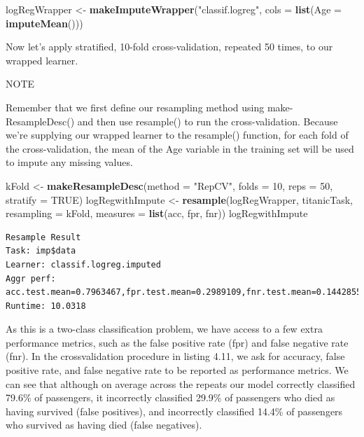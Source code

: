 \documentclass[
]{article}
\newenvironment{Shaded}{\begin{snugshade}}{\end{snugshade}}
\newcommand{\AttributeTok}[1]{\textcolor[rgb]{0.13,0.29,0.53}{#1}}
\newcommand{\ConstantTok}[1]{\textcolor[rgb]{0.56,0.35,0.01}{#1}}
\newcommand{\DecValTok}[1]{\textcolor[rgb]{0.00,0.00,0.81}{#1}}
\newcommand{\FunctionTok}[1]{\textcolor[rgb]{0.13,0.29,0.53}{\textbf{#1}}}
\newcommand{\NormalTok}[1]{#1}
\newcommand{\OtherTok}[1]{\textcolor[rgb]{0.56,0.35,0.01}{#1}}
\newcommand{\StringTok}[1]{\textcolor[rgb]{0.31,0.60,0.02}{#1}}
\begin{document}
\begin{Shaded}
\begin{Highlighting}[]
\NormalTok{logRegWrapper }\OtherTok{\textless{}{-}} \FunctionTok{makeImputeWrapper}\NormalTok{(}\StringTok{"classif.logreg"}\NormalTok{,}
                                   \AttributeTok{cols =} \FunctionTok{list}\NormalTok{(}\AttributeTok{Age =} \FunctionTok{imputeMean}\NormalTok{()))}
\end{Highlighting}
\end{Shaded}

Now let's apply stratified, 10-fold cross-validation, repeated 50 times,
to our wrapped learner.

NOTE

Remember that we first define our resampling method using
make-ResampleDesc() and then use resample() to run the cross-validation.
Because we're supplying our wrapped learner to the resample() function,
for each fold of the cross-validation, the mean of the Age variable in
the training set will be used to impute any missing values.

\begin{Shaded}
\begin{Highlighting}[]
\NormalTok{kFold }\OtherTok{\textless{}{-}} \FunctionTok{makeResampleDesc}\NormalTok{(}\AttributeTok{method =} \StringTok{"RepCV"}\NormalTok{, }\AttributeTok{folds =} \DecValTok{10}\NormalTok{, }\AttributeTok{reps =} \DecValTok{50}\NormalTok{, }
                          \AttributeTok{stratify =} \ConstantTok{TRUE}\NormalTok{)}
\NormalTok{logRegwithImpute }\OtherTok{\textless{}{-}} \FunctionTok{resample}\NormalTok{(logRegWrapper, titanicTask,}
                             \AttributeTok{resampling =}\NormalTok{ kFold,}
                             \AttributeTok{measures =} \FunctionTok{list}\NormalTok{(acc, fpr, fnr))}
\NormalTok{logRegwithImpute}
\end{Highlighting}
\end{Shaded}

\begin{verbatim}
Resample Result
Task: imp$data
Learner: classif.logreg.imputed
Aggr perf: acc.test.mean=0.7963467,fpr.test.mean=0.2989109,fnr.test.mean=0.1442855
Runtime: 10.0318
\end{verbatim}

As this is a two-class classification problem, we have access to a few
extra performance metrics, such as the false positive rate (fpr) and
false negative rate (fnr). In the crossvalidation procedure in listing
4.11, we ask for accuracy, false positive rate, and false negative rate
to be reported as performance metrics. We can see that although on
average across the repeats our model correctly classified 79.6\% of
passengers, it incorrectly classified 29.9\% of passengers who died as
having survived (false positives), and incorrectly classified 14.4\% of
passengers who survived as having died (false negatives).
\end{document}
